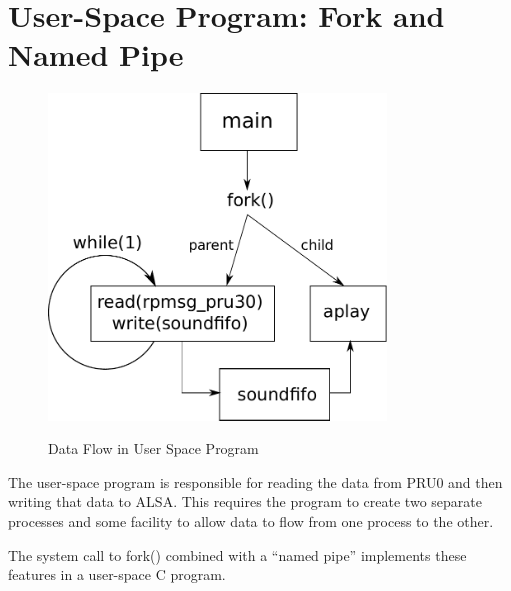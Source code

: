 %
%
%

\chapter{User-Space Program: Fork and Named Pipe}

	\begin{figure}[h]
		\centering
		\includegraphics[width=0.8\textwidth]{diagrams/user_space_fork}
		\centering\bfseries
		\caption{Data Flow in User Space Program}
	\end{figure}
		
	The user-space program is responsible for reading the data from PRU0 and then writing that data to ALSA.
	This requires the program to create two separate processes and some facility to allow data to flow from one process to the other.
	
	The system call to fork() combined with a ``named pipe'' implements these features in a user-space C program.
	
